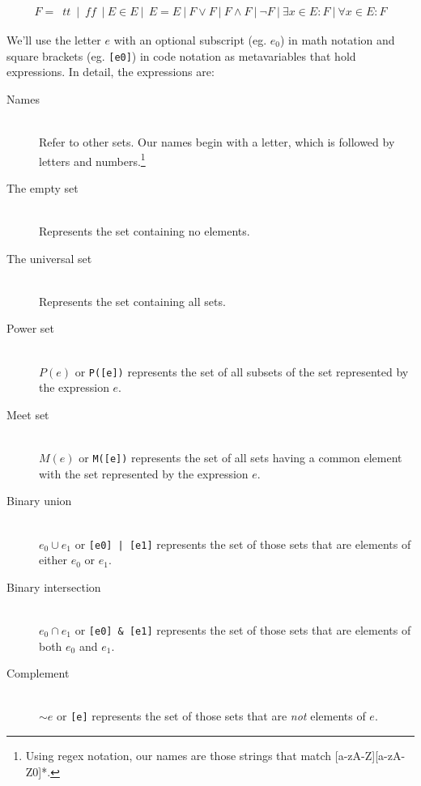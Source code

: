\documentclass[oneside,12pt]{book}
\theoremstyle{definition}
\theoremstyle{remark}
\newcommand{\tde}{\raisebox{0.5ex}{\texttildelow}}
\newcommand{\ct}{{\sim}} %
\newcommand\var[1]{\mathop{\mathit{#1}}\nolimits}
\newcommand{\pSet}{P}
\newcommand{\mSet}{M}
\newcommand{\false}{\var{tt}}
\newcommand{\true}{\var{ff}}
\begin{document}
\begin{align*}
  F = ~\false~|~\true~|~E \in E~|~~E = E~|~F \lor F~|~F \land F~|~\neg F%
  ~|~\exists x \in E\colon F~|~\forall x\in E\colon F
\end{align*}

\noindent We'll use the letter $e$ with an optional subscript (eg. $e_0$) in math
notation and square brackets (eg. \texttt{[e0]}) in code notation as metavariables
that hold expressions. In detail, the expressions are:

\begin{description}
  \item[Names] \hfill \\
    Refer to other sets. Our names begin with a letter, which is
    followed by letters and numbers.\footnote{Using regex notation, our names
    are those strings that match
    [a\nobreakdash-zA\nobreakdash-Z][a\nobreakdash-zA\nobreakdash-Z0]*.}
    
  \item[The empty set] \hfill \\
    Represents the set containing no elements.
    
  \item[The universal set] \hfill \\
    Represents the set containing all sets.
    
  \item[Power set] \hfill \\
    $\pSet(e)$ or \texttt{P([e])} represents the set of all subsets of the set
    represented by the expression $e$.
    
  \item[Meet set] \hfill \\
    $\mSet(e)$ or \texttt{M([e])} represents the set of all sets having a common
    element with the set represented by the expression $e$.
    
  \item[Binary union] \hfill \\
    $e_0 \cup e_1$ or \texttt{[e0] | [e1]} represents the set of those sets that
    are elements of either $e_0$ or $e_1$.
    
  \item[Binary intersection] \hfill \\
    $e_0 \cap e_1$ or \texttt{[e0] \& [e1]} represents the set of those sets that
    are elements of both $e_0$ and $e_1$.
    
  \item[Complement] \hfill \\
    $\ct e$ or \texttt{\tde [e]} represents the set of those sets that
    are \textit{not} elements of $e$.
    

\end{description}
\end{document}
